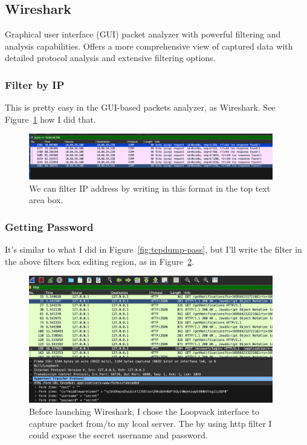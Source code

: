 \documentclass{article}
\begin{document}
\subsection{Wireshark}
Graphical user interface (GUI) packet analyzer with powerful filtering and analysis capabilities.
Offers a more comprehensive view of captured data with detailed protocol analysis and extensive filtering options.

\subsubsection{Filter by IP}
This is pretty easy in the GUI-based packets analyzer, as Wireshark. See Figure~\ref{fig:wireshark-ip} how I did that.
\begin{figure}
	\begin{center}
		\includegraphics[width=0.95\textwidth]{figures/wireshark-ip.png}
	\end{center}
	\caption{We can filter IP address by writing in this format in the top text area box.}
	\label{fig:wireshark-ip}
\end{figure}

\subsubsection{Getting Password}
It's similar to what I did in Figure~\ref{fig:tcpdump-pass}, but I'll write the filter in the above filters box editing region, as in Figure~\ref{fig:wireshark-pass}.
\begin{figure}
	\begin{center}
		\includegraphics[width=0.95\textwidth]{figures/wireshark-pass.png}
	\end{center}
	\caption{Before launching Wireshark, I chose the Loopvack interface to capture packet from/to my lcoal server. The by using
		http filter I could expose the secret username and password.}
	\label{fig:wireshark-pass}
\end{figure}
\end{document}
